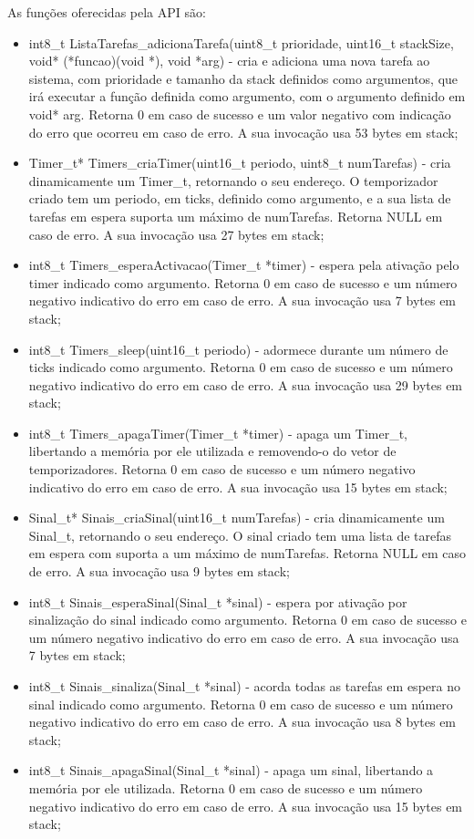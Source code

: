 \documentclass[journal]{IEEEtran}
\begin{document}
As funções oferecidas pela API são:
\begin{itemize}
	\item 	int8\_t ListaTarefas\_adicionaTarefa(uint8\_t prioridade, uint16\_t stackSize, void* (*funcao)(void *), void *arg) - cria e adiciona uma nova tarefa ao sistema, com prioridade
	e tamanho da stack definidos como argumentos, que irá executar a função definida como argumento, com o argumento definido em void* arg. Retorna 0 em caso de sucesso e
	um valor negativo com indicação do erro que ocorreu em caso de erro. A sua invocação usa 53 bytes em stack;

	\item 	Timer\_t* Timers\_criaTimer(uint16\_t periodo, uint8\_t numTarefas) - cria dinamicamente um Timer\_t, retornando o seu endereço. O temporizador criado tem um
		periodo, em ticks, definido como argumento, e a sua lista de tarefas em espera suporta um máximo de numTarefas. Retorna NULL em caso de erro. A sua invocação usa 27
		bytes em stack;
	\item	int8\_t Timers\_esperaActivacao(Timer\_t *timer) - espera pela ativação pelo timer indicado como argumento. Retorna 0 em caso de sucesso e um número negativo
		indicativo do erro em caso de erro. A sua invocação usa 7 bytes em stack;
	\item	int8\_t Timers\_sleep(uint16\_t periodo) - adormece durante um número de ticks indicado como argumento. Retorna 0 em caso de sucesso e um número negativo 
		indicativo do erro em caso de erro. A sua invocação usa 29 bytes em stack;
	\item	int8\_t Timers\_apagaTimer(Timer\_t *timer) - apaga um Timer\_t, libertando a memória por ele utilizada e removendo-o do vetor de temporizadores. Retorna 0 em caso de 
		sucesso e um número negativo indicativo do erro em caso de erro. A sua invocação usa 15 bytes em stack;

	\item	Sinal\_t* Sinais\_criaSinal(uint16\_t numTarefas) - cria dinamicamente um Sinal\_t, retornando o seu endereço. O sinal criado tem uma lista de tarefas em
		espera com suporta a um máximo de numTarefas. Retorna NULL em caso de erro. A sua invocação usa 9 bytes em stack;
	\item	int8\_t Sinais\_esperaSinal(Sinal\_t *sinal) - espera por ativação por sinalização do sinal indicado como argumento. Retorna 0 em caso de sucesso e um número
		negativo indicativo do erro em caso de erro. A sua invocação usa 7 bytes em stack;
	\item	int8\_t Sinais\_sinaliza(Sinal\_t *sinal) - acorda todas as tarefas em espera no sinal indicado como argumento. Retorna 0 em caso de sucesso e um número negativo
		indicativo do erro em caso de erro. A sua invocação usa 8 bytes em stack;
	\item	int8\_t Sinais\_apagaSinal(Sinal\_t *sinal) - apaga um sinal, libertando a memória por ele utilizada. Retorna 0 em caso de sucesso e um número negativo indicativo
		do erro em caso de erro. A sua invocação usa 15 bytes em stack;



\end{itemize}
\end{document}

